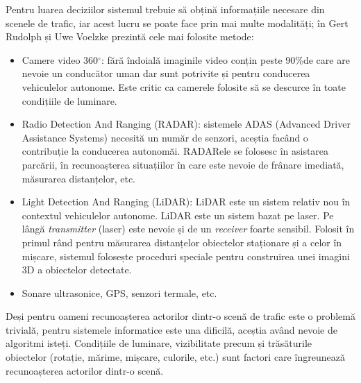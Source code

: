 Pentru luarea deciziilor sistemul trebuie să obțină informațiile necesare din scenele de trafic, iar acest lucru se poate face prin mai multe modalități; în \cite{car_sensors}  Gert Rudolph și Uwe Voelzke prezintă cele mai folosite metode:
\begin{itemize}
	\item Camere video 360$^\circ$: fără îndoială imaginile video conțin peste 90\%de care are nevoie un conducător uman dar sunt potrivite și pentru conducerea vehiculelor autonome. Este critic ca camerele folosite să se descurce în toate condițiile de luminare.
	\item Radio Detection And Ranging (RADAR): sistemele ADAS (Advanced Driver Assistance Systems) necesită un număr de senzori, aceștia facând o contribuție la conducerea autonomăi. RADARele se folosesc în asistarea parcării, în recunoașterea situațiilor în care este nevoie de frânare imediată, măsurarea distanțelor, etc.
	\item Light Detection And Ranging (LiDAR): LiDAR este un sistem relativ nou în contextul vehiculelor autonome. LiDAR este un sistem bazat pe laser. Pe lângă \textit{transmitter} (laser) este nevoie și de un \textit{receiver} foarte sensibil. Folosit în primul rând pentru măsurarea distanțelor obiectelor staționare și a celor în mișcare, sistemul folosește proceduri speciale pentru construirea unei imagini 3D a obiectelor detectate.
	\item Sonare ultrasonice, GPS, senzori termale, etc.
\end{itemize}
Deși pentru oameni recunoașterea actorilor dintr-o scenă de trafic este o problemă trivială, pentru sistemele informatice este una dificilă, aceștia având nevoie de algoritmi isteți. Condițiile de luminare, vizibilitate precum și trăsăturile obiectelor (rotație, mărime, mișcare, culorile, etc.) sunt factori care îngreunează recunoașterea actorilor dintr-o scenă.
